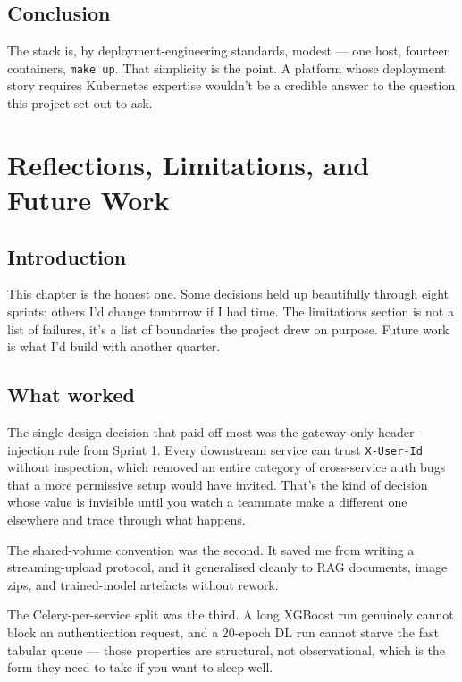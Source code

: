 \documentclass[12pt, a4paper]{report}
\begin{document}
\section*{Conclusion}

The stack is, by deployment-engineering standards, modest --- one
host, fourteen containers, \texttt{make up}. That simplicity is the
point. A platform whose deployment story requires Kubernetes
expertise wouldn't be a credible answer to the question this project
set out to ask.

\chapter{Reflections, Limitations, and Future Work}

\section*{Introduction}

This chapter is the honest one. Some decisions held up beautifully
through eight sprints; others I'd change tomorrow if I had time. The
limitations section is not a list of failures, it's a list of
boundaries the project drew on purpose. Future work is what I'd build
with another quarter.

\section{What worked}

The single design decision that paid off most was the gateway-only
header-injection rule from Sprint 1. Every downstream service can
trust \texttt{X-User-Id} without inspection, which removed an entire
category of cross-service auth bugs that a more permissive setup
would have invited. That's the kind of decision whose value is
invisible until you watch a teammate make a different one elsewhere
and trace through what happens.

The shared-volume convention was the second. It saved me from writing
a streaming-upload protocol, and it generalised cleanly to RAG
documents, image zips, and trained-model artefacts without rework.

The Celery-per-service split was the third. A long XGBoost run
genuinely cannot block an authentication request, and a 20-epoch DL
run cannot starve the fast tabular queue --- those properties are
structural, not observational, which is the form they need to take
if you want to sleep well.
\end{document}
